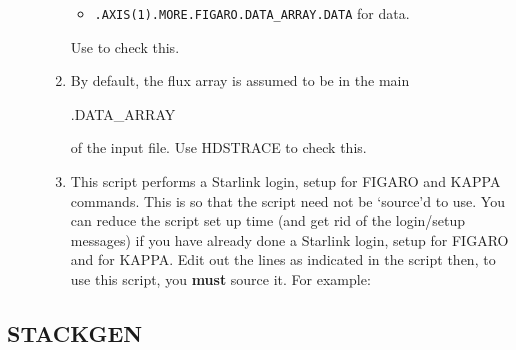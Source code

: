 \documentclass[twoside,11pt]{starlink}
\begin{document}
\begin{description}
\begin{enumerate}
\begin{itemize}
\item \verb+.AXIS(1).MORE.FIGARO.DATA_ARRAY.DATA+ for
       data.

\end{itemize}

      Use  to check this.

\item By default, the flux array is assumed to be in the main

\begin{terminalv}
   .DATA_ARRAY
\end{terminalv}

       of the input file.  Use HDSTRACE to check this.

\item This script performs a Starlink login, setup for FIGARO
      and KAPPA commands.  This is so that the script need not be
      `source'd to use.  You can reduce the script set up time (and
      get rid of the login/setup messages) if you have already done a
      Starlink login, setup for FIGARO and for KAPPA.  Edit out the
      lines as indicated in the script then, to use this script, you
      \textbf{must} source it.  For example:

\begin{terminalv}
\end{terminalv}
\end{enumerate}
\end{description}


\newpage
\subsection{\label{se_stackgen}STACKGEN}
\end{document}
